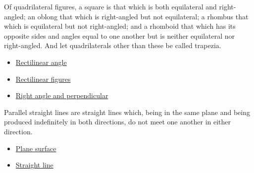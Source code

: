 \begin{definition}
\label{def-euclid-quadrilateral-classes}
Of quadrilateral figures, a square is that which is both equilateral and
right-angled; an oblong that which is right-angled but not equilateral; a
rhombus that which is equilateral but not right-angled; and a rhomboid that
which has its opposite sides and angles equal to one another but is neither
equilateral nor right-angled. And let quadrilaterals other than these be called
trapezia.
\end{definition}
\begin{lra-not-visible}
\begin{dependencies}
\begin{itemize}
  \item \hyperref[def-euclid-rectilinear-angle]{Rectilinear angle}
  \item \hyperref[def-euclid-rectilinear-figures]{Rectilinear figures}
  \item \hyperref[def-euclid-right-angle-and-perpendicular]{Right angle and perpendicular}
\end{itemize}
\end{dependencies}
\end{lra-not-visible}

\begin{definition}
\label{def-euclid-parallel-straight-lines}
Parallel straight lines are straight lines which, being in the same plane and
being produced indefinitely in both directions, do not meet one another in
either direction.
\end{definition}
\begin{lra-not-visible}
\begin{dependencies}
\begin{itemize}
  \item \hyperref[def-euclid-plane-surface]{Plane surface}
  \item \hyperref[def-euclid-straight-line]{Straight line}
\end{itemize}
\end{dependencies}
\end{lra-not-visible}

